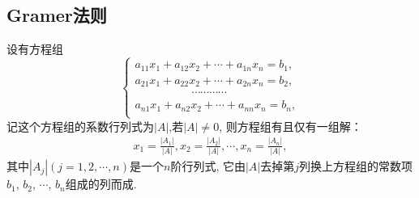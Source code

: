 \subsection{Gramer法则}

\begin{theorem}[Gramer法则]\label{thm:Gramer}
  设有方程组
  \begin{equation}\label{eq:Determinant6}
    \begin{cases}
      a_{11}x_1+a_{12}x_2+\cdots+a_{1n}x_n=b_1,\\
      a_{21}x_1+a_{22}x_2+\cdots+a_{2n}x_n=b_2,\\
      \hspace{5em}\cdots\cdots\cdots\cdots\\
      a_{n1}x_1+a_{n2}x_2+\cdots+a_{nn}x_n=b_n,\\
    \end{cases}
  \end{equation}
  记这个方程组的系数行列式为$|A|$,若$|A|\neq 0$, 则方程组有且仅有一组解：
  \begin{align}\label{eq:Determinant7}
    x_1=\frac{|A_1|}{|A|},x_2=\frac{|A_2|}{|A|},
    \cdots,x_n=\frac{|A_n|}{|A|},
  \end{align}
  其中$|A_j|(j=1,2,\cdots,n)$是一个$n$阶行列式,
  它由$|A|$去掉第$j$列换上方程组的常数项$b_1$, $b_2$, $\cdots$, $b_n$组成的列而成.
\end{theorem}

